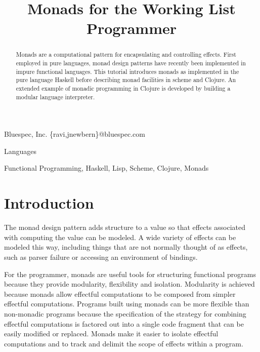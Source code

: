 \documentclass[natbib,10pt]{sigplanconf}
\begin{document}
\copyrightdata{[to be supplied]}
\toappear{}


\title{Monads for the Working List Programmer}

           {Bluespec, Inc.}
           {\{ravi,jnewbern\}@bluespec.com}

\maketitle

\begin{abstract}

Monads are a computational pattern for encapsulating and controlling
effects.  First employed in pure languages, monad design patterns have
recently been implemented in impure functional languages.  This
tutorial introduces monads as implemented in the pure language Haskell
before describing monad facilities in scheme and Clojure.  An extended
example of monadic programming in Clojure is developed by building a
modular language interpreter.

\end{abstract}


\terms
Languages

\keywords
Functional Programming, Haskell, Lisp, Scheme, Clojure, Monads


\section{Introduction}

The monad design pattern adds structure to a value so that effects
associated with computing the value can be modeled.  A wide variety of
effects can be modeled this way, including things that are not
normally thought of as effects, such as parser failure or accessing an
environment of bindings.

For the programmer, monads are useful tools for structuring functional
programs because they provide modularity, flexibility and isolation.
Modularity is achieved because monads allow effectful computations to
be composed from simpler effectful computations.  Programs built using
monads can be more flexible than non-monadic programs because the
specification of the strategy for combining effectful computations is
factored out into a single code fragment that can be easily modified
or replaced.  Monads make it easier to isolate effectful computations
and to track and delimit the scope of effects within a program.
\end{document}
